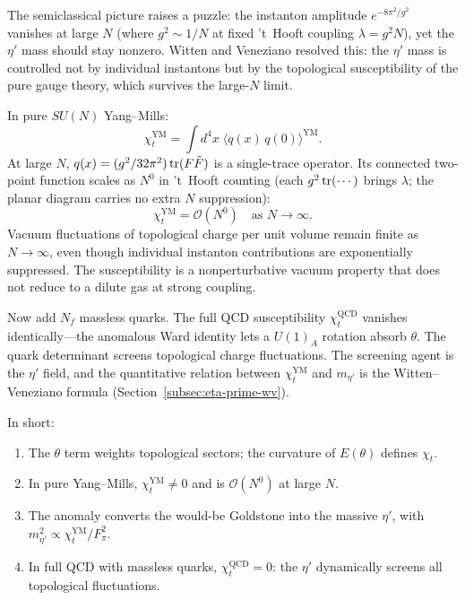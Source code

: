 The semiclassical picture raises a puzzle: the instanton amplitude $e^{-8\pi^2/g^2}$ vanishes at large $N$ (where $g^2\sim 1/N$ at fixed 't~Hooft coupling $\lambda = g^2 N$), yet the $\eta'$ mass should stay nonzero.  Witten \cite{Witten1979U1GoldstoneBoson} and Veneziano \cite{Veneziano1979U1WithoutInstantons} resolved this: the $\eta'$ mass is controlled not by individual instantons but by the topological susceptibility of the pure gauge theory, which survives the large-$N$ limit.

In pure $SU(N)$ Yang--Mills:
\begin{equation}\label{eq:chi-t-spectral}
  \chi_t^{\mathrm{YM}} = \int d^4x\;\langle q(x)\,q(0)\rangle^{\mathrm{YM}}.
\end{equation}
At large $N$, $q(x) = (g^2/32\pi^2)\operatorname{tr}(F\tilde{F})$ is a single-trace operator.  Its connected two-point function scales as $N^0$ in 't~Hooft counting (each $g^2\operatorname{tr}(\cdots)$ brings $\lambda$; the planar diagram carries no extra $N$ suppression):
\begin{equation}\label{eq:chi-t-largeN}
  \chi_t^{\mathrm{YM}} = \mathcal{O}(N^0) \quad\text{as } N\to\infty.
\end{equation}
Vacuum fluctuations of topological charge per unit volume remain finite as $N\to\infty$, even though individual instanton contributions are exponentially suppressed.  The susceptibility is a nonperturbative vacuum property that does not reduce to a dilute gas at strong coupling.

Now add $N_f$ massless quarks.  The full QCD susceptibility $\chi_t^{\mathrm{QCD}}$ vanishes identically---the anomalous Ward identity lets a $U(1)_A$ rotation absorb $\theta$.  The quark determinant screens topological charge fluctuations.  The screening agent is the $\eta'$ field, and the quantitative relation between $\chi_t^{\mathrm{YM}}$ and $m_{\eta'}$ is the Witten--Veneziano formula (Section~\ref{subsec:eta-prime-wv}).

In short:
\begin{enumerate}
  \item The $\theta$ term weights topological sectors; the curvature of $E(\theta)$ defines $\chi_t$.
  \item In pure Yang--Mills, $\chi_t^{\mathrm{YM}}\neq 0$ and is $\mathcal{O}(N^0)$ at large $N$.
  \item The anomaly converts the would-be Goldstone into the massive $\eta'$, with $m_{\eta'}^2\propto\chi_t^{\mathrm{YM}}/F_\pi^2$.
  \item In full QCD with massless quarks, $\chi_t^{\mathrm{QCD}}=0$: the $\eta'$ dynamically screens all topological fluctuations.
\end{enumerate}

